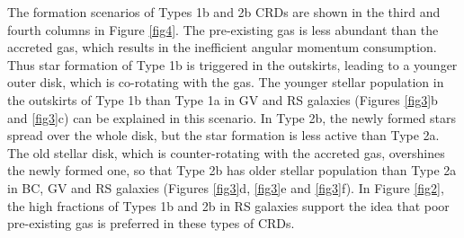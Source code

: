 \documentclass{aastex631}
\begin{document}
The formation scenarios of Types 1b and 2b CRDs are shown in the third and fourth columns in Figure \ref{fig4}. The pre-existing gas is less abundant than the accreted gas, which results in the inefficient angular momentum consumption. Thus star formation of Type 1b is triggered in the outskirts, leading to a younger outer disk, which is co-rotating with the gas. The younger stellar population in the outskirts of Type 1b than Type 1a in GV and RS galaxies (Figures \ref{fig3}b and \ref{fig3}c) can be explained in this scenario. In Type 2b, the newly formed stars spread over the whole disk, but the star formation is less active than Type 2a. The old stellar disk, which is counter-rotating with the accreted gas, overshines the newly formed one, so that Type 2b has older stellar population than Type 2a in BC, GV and RS galaxies (Figures \ref{fig3}d, \ref{fig3}e and \ref{fig3}f). In Figure \ref{fig2}, the high fractions of Types 1b and 2b in RS galaxies support the idea that poor pre-existing gas is preferred in these types of CRDs.
\end{document}
